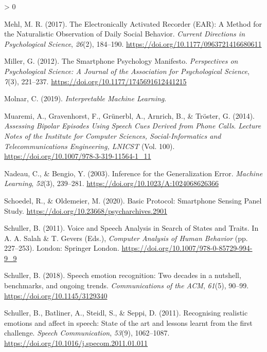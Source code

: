 \documentclass[
  english,
  man,floatsintext]{apa6}
\newlength{\cslhangindent}
\newenvironment{CSLReferences}[2] %
 {%
  \setlength{\parindent}{0pt}
  \ifodd #1 \everypar{\setlength{\hangindent}{\cslhangindent}}\ignorespaces\fi
  \ifnum #2 > 0
  \setlength{\parskip}{#2\baselineskip}
  \fi
 }%
 {}
\begin{document}
\begin{CSLReferences}{1}{0}
\leavevmode\hypertarget{ref-mehlElectronicallyActivatedRecorder2017}{}%
Mehl, M. R. (2017). The {Electronically Activated Recorder} ({EAR}): A {Method} for the {Naturalistic Observation} of {Daily Social Behavior}. \emph{Current Directions in Psychological Science}, \emph{26}(2), 184--190. \url{https://doi.org/10.1177/0963721416680611}

\leavevmode\hypertarget{ref-millerSmartphonePsychologyManifesto2012}{}%
Miller, G. (2012). The {Smartphone Psychology Manifesto}. \emph{Perspectives on Psychological Science: A Journal of the Association for Psychological Science}, \emph{7}(3), 221--237. \url{https://doi.org/10.1177/1745691612441215}

\leavevmode\hypertarget{ref-molnarInterpretableMachineLearning2019}{}%
Molnar, C. (2019). \emph{Interpretable {Machine Learning}}.

\leavevmode\hypertarget{ref-muaremiAssessingBipolarEpisodes2014}{}%
Muaremi, A., Gravenhorst, F., Grünerbl, A., Arnrich, B., \& Tröster, G. (2014). \emph{Assessing {Bipolar Episodes Using Speech Cues Derived} from {Phone Calls}}. \emph{Lecture Notes of the Institute for Computer Sciences, Social-Informatics and Telecommunications Engineering, LNICST} (Vol. 100). \url{https://doi.org/10.1007/978-3-319-11564-1_11}

\leavevmode\hypertarget{ref-nadeauInferenceGeneralizationError2003}{}%
Nadeau, C., \& Bengio, Y. (2003). Inference for the {Generalization Error}. \emph{Machine Learning}, \emph{52}(3), 239--281. \url{https://doi.org/10.1023/A:1024068626366}

\leavevmode\hypertarget{ref-schoedelBasicProtocolSmartphone2020}{}%
Schoedel, R., \& Oldemeier, M. (2020). Basic {Protocol}: Smartphone {Sensing Panel Study}. \url{https://doi.org/10.23668/psycharchives.2901}

\leavevmode\hypertarget{ref-schullerVoiceSpeechAnalysis2011}{}%
Schuller, B. (2011). Voice and {Speech Analysis} in {Search} of {States} and {Traits}. In A. A. Salah \& T. Gevers (Eds.), \emph{Computer {Analysis} of {Human Behavior}} (pp. 227--253). {London}: {Springer London}. \url{https://doi.org/10.1007/978-0-85729-994-9_9}

\leavevmode\hypertarget{ref-schullerSpeechEmotionRecognition2018}{}%
Schuller, B. (2018). Speech emotion recognition: Two decades in a nutshell, benchmarks, and ongoing trends. \emph{Communications of the ACM}, \emph{61}(5), 90--99. \url{https://doi.org/10.1145/3129340}

\leavevmode\hypertarget{ref-schullerRecognisingRealisticEmotions2011}{}%
Schuller, B., Batliner, A., Steidl, S., \& Seppi, D. (2011). Recognising realistic emotions and affect in speech: State of the art and lessons learnt from the first challenge. \emph{Speech Communication}, \emph{53}(9), 1062--1087. \url{https://doi.org/10.1016/j.specom.2011.01.011}


\end{CSLReferences}
\end{document}
